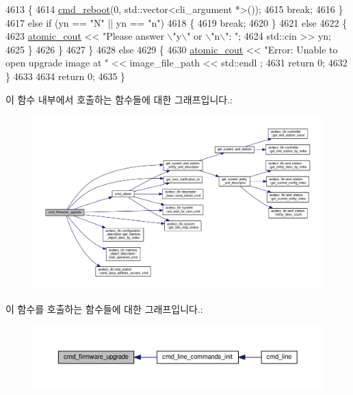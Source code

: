 \begin{DoxyCode}
4613             \{
4614                 \hyperlink{classcmd__line_a507353a665b5d1b1ea291ae5dcc7f8a0}{cmd\_reboot}(0, std::vector<cli\_argument *>());
4615                 \textcolor{keywordflow}{break};
4616             \}
4617             \textcolor{keywordflow}{else} \textcolor{keywordflow}{if} (yn == \textcolor{stringliteral}{"N"} || yn == \textcolor{stringliteral}{"n"})
4618             \{
4619                 \textcolor{keywordflow}{break};
4620             \}
4621             \textcolor{keywordflow}{else}
4622             \{
4623                 \hyperlink{cmd__line_8h_a0bc38ccc65c79ba06c6fcd7b4bf554c3}{atomic\_cout} << \textcolor{stringliteral}{"Please answer \(\backslash\)"y\(\backslash\)" or \(\backslash\)"n\(\backslash\)": "};
4624                 std::cin >> yn;
4625             \}
4626         \}
4627     \}
4628     \textcolor{keywordflow}{else}
4629     \{
4630         \hyperlink{cmd__line_8h_a0bc38ccc65c79ba06c6fcd7b4bf554c3}{atomic\_cout} << \textcolor{stringliteral}{"Error: Unable to open upgrade image at "} << image\_file\_path << std::endl
      ;
4631         \textcolor{keywordflow}{return} 0;
4632     \}
4633 
4634     \textcolor{keywordflow}{return} 0;
4635 \}
\end{DoxyCode}


이 함수 내부에서 호출하는 함수들에 대한 그래프입니다.\+:
\nopagebreak
\begin{figure}[H]
\begin{center}
\leavevmode
\includegraphics[width=350pt]{classcmd__line_a5c9a5e2f1fa8b53d350bb588894759b0_cgraph}
\end{center}
\end{figure}




이 함수를 호출하는 함수들에 대한 그래프입니다.\+:
\nopagebreak
\begin{figure}[H]
\begin{center}
\leavevmode
\includegraphics[width=350pt]{classcmd__line_a5c9a5e2f1fa8b53d350bb588894759b0_icgraph}
\end{center}
\end{figure}


